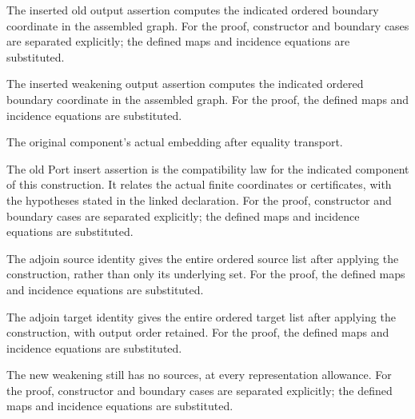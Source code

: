 The inserted old output assertion computes the indicated ordered boundary coordinate in the assembled graph.
For the proof, constructor and boundary cases are separated explicitly; the defined maps and incidence equations are substituted.
\par{}

The inserted weakening output assertion computes the indicated ordered boundary coordinate in the assembled graph.
For the proof, the defined maps and incidence equations are substituted.
\par{}

The original component's actual embedding after equality transport.
\par{}

The old Port insert assertion is the compatibility law for the indicated component of this construction. It relates the actual finite coordinates or certificates, with the hypotheses stated in the linked declaration.
For the proof, constructor and boundary cases are separated explicitly; the defined maps and incidence equations are substituted.
\par{}

The adjoin source identity gives the entire ordered source list after applying the construction, rather than only its underlying set.
For the proof, the defined maps and incidence equations are substituted.
\par{}

The adjoin target identity gives the entire ordered target list after applying the construction, with output order retained.
For the proof, the defined maps and incidence equations are substituted.
\par{}

The new weakening still has no sources, at every representation allowance.
For the proof, constructor and boundary cases are separated explicitly; the defined maps and incidence equations are substituted.
\par{}

